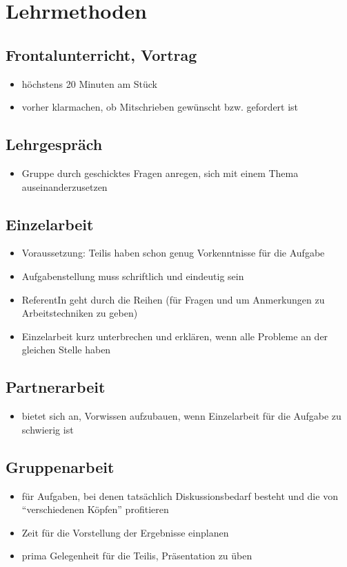 \chapter{Lehrmethoden}
\label{lehrmethoden}

\section{Frontalunterricht, Vortrag}
\begin{itemize}
 \item höchstens 20 Minuten am Stück
 \item vorher klarmachen, ob Mitschrieben gewünscht bzw. gefordert ist
\end{itemize}

\section{Lehrgespräch}
\begin{itemize}
 \item Gruppe durch geschicktes Fragen anregen, sich mit einem Thema auseinanderzusetzen
\end{itemize}

\section{Einzelarbeit}
\begin{itemize}
 \item Voraussetzung: Teilis haben schon genug Vorkenntnisse für die Aufgabe
 \item Aufgabenstellung muss schriftlich und eindeutig sein
 \item ReferentIn geht durch die Reihen (für Fragen und um Anmerkungen zu Arbeitstechniken zu geben)
 \item Einzelarbeit kurz unterbrechen und erklären, wenn alle Probleme an der gleichen Stelle haben
\end{itemize}

\section{Partnerarbeit}
\begin{itemize}
 \item bietet sich an, Vorwissen aufzubauen, wenn Einzelarbeit für die Aufgabe zu schwierig ist
\end{itemize}

\section{Gruppenarbeit}
\begin{itemize}
 \item für Aufgaben, bei denen tatsächlich Diskussionsbedarf besteht und die von ``verschiedenen Köpfen'' profitieren
 \item Zeit für die Vorstellung der Ergebnisse einplanen
 \item prima Gelegenheit für die Teilis, Präsentation zu üben
\end{itemize}

